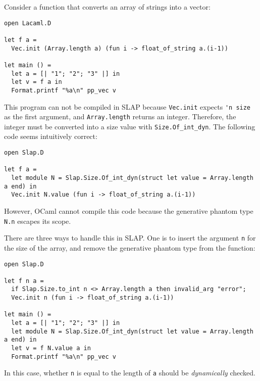 \documentclass[10pt,a4paper]{article}
\begin{document}
Consider a function that converts an array of strings into a vector:
\begin{lstlisting}
open Lacaml.D

let f a =
  Vec.init (Array.length a) (fun i -> float_of_string a.(i-1))

let main () =
  let a = [| "1"; "2"; "3" |] in
  let v = f a in
  Format.printf "%a\n" pp_vec v
\end{lstlisting}
This program can not be compiled in SLAP because \lstinline|Vec.init| expects
\lstinline|'n size| as the first argument, and \lstinline|Array.length|
returns an integer.
Therefore, the integer must be converted into a size value with
\lstinline|Size.Of_int_dyn|. The following code seems intuitively correct:
\begin{lstlisting}
open Slap.D

let f a =
  let module N = Slap.Size.Of_int_dyn(struct let value = Array.length a end) in
  Vec.init N.value (fun i -> float_of_string a.(i-1))
\end{lstlisting}
However, OCaml cannot compile this code because the generative phantom type
\lstinline|N.n| escapes its scope.

There are three ways to handle this in SLAP. One is to insert the argument \lstinline|n| for
the size of the array, and remove the generative phantom type from
the function:
\begin{lstlisting}
open Slap.D

let f n a =
  if Slap.Size.to_int n <> Array.length a then invalid_arg "error";
  Vec.init n (fun i -> float_of_string a.(i-1))

let main () =
  let a = [| "1"; "2"; "3" |] in
  let module N = Slap.Size.Of_int_dyn(struct let value = Array.length a end) in
  let v = f N.value a in
  Format.printf "%a\n" pp_vec v
\end{lstlisting}
In this case, whether \lstinline|n| is equal
to the length of \lstinline|a| should be \emph{dynamically} checked.
\end{document}
